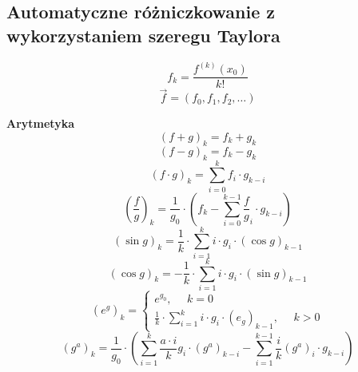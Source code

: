 \documentclass[../mn-notatki.tex]{subfiles}
\begin{document}
\subsection{Automatyczne różniczkowanie z wykorzystaniem szeregu Taylora}
\begin{tcolorbox}
\[
f_k = \frac{f^{(k)}(x_0)}{k!}
\]
\[
\vec{f} = (f_0, f_1, f_2, \ldots)
\]
\end{tcolorbox}

\begin{tcolorbox}
\textbf{Arytmetyka}
    $$(f + g)_k  = f_k + g_k$$
    $$(f - g)_k  = f_k - g_k$$
    $$(f \cdot g)_k  = \sum_{i=0}^{k} f_i \cdot g_{k-i}$$
    $$\left(\frac{f}{g}\right)_k  = \frac{1}{g_0} \cdot \left( f_k - \sum_{i=0}^{k-1} \frac{f}{g}_{i} \cdot g_{k-i} \right)$$
    $$(\sin g)_k = \frac{1}{k} \cdot \sum_{i=1}^{k} i \cdot g_i \cdot (\cos g)_{k-1}$$
    $$(\cos g)_k = -\frac{1}{k} \cdot \sum_{i=1}^{k} i \cdot g_i \cdot (\sin g)_{k-1}$$
    $$
    (e^g)_k =
    \begin{cases}
    e^{g_0}, ~~~~~~ k = 0\\
    \frac{1}{k} \cdot \sum_{i=1}^{k} i \cdot g_i \cdot \left(e_g\right)_{k-1},~~~~~~ k >0
    \end{cases}
    $$
    $$
    (g^a)_k =  \frac{1}{g_0} \cdot \left( \sum_{i=1}^{k} \frac{a\cdot i}{k}g_i \cdot (g^a)_{k-i}- \sum_{i=1}^{k-1} \frac{i}{k} (g^a)_i \cdot g_{k-i}\right)
    $$
\end{tcolorbox}

\pagebreak
\end{document}
